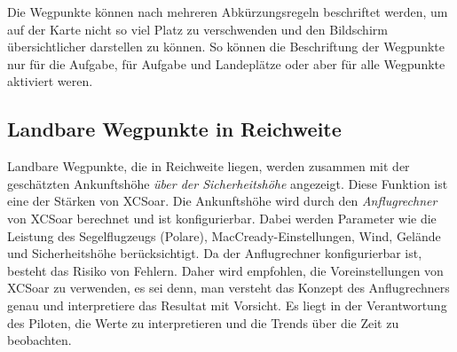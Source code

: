 Die Wegpunkte können nach mehreren Abkürzungsregeln beschriftet werden, um auf 
 der Karte nicht so viel Platz zu verschwenden und den Bildschirm übersichtlicher darstellen zu können. 
So können die Beschriftung der Wegpunkte nur für die Aufgabe, für Aufgabe und Landeplätze oder aber für alle Wegpunkte aktiviert weren.

\subsection*{Landbare Wegpunkte in Reichweite}
%
%

Landbare Wegpunkte, die in Reichweite liegen, werden zusammen mit der geschätzten Ankunftshöhe \emph{über der Sicherheitshöhe}
angezeigt. Diese Funktion ist eine der Stärken von XCSoar. Die Ankunftshöhe wird durch den  \emph{Anflugrechner} von XCSoar
berechnet und ist konfigurierbar. Dabei werden Parameter wie die Leistung des Segelflugzeugs (Polare),
MacCready-Einstellungen, Wind, Gelände und Sicherheitshöhe berücksichtigt. Da der Anflugrechner konfigurierbar ist,
besteht das Risiko von Fehlern. Daher wird empfohlen, die Voreinstellungen von XCSoar zu verwenden, es sei denn,
man versteht das Konzept des Anflugrechners genau
\warning
und interpretiere das Resultat mit Vorsicht. Es liegt in der Verantwortung
des Piloten, die Werte zu interpretieren und die Trends über die Zeit zu beobachten.

